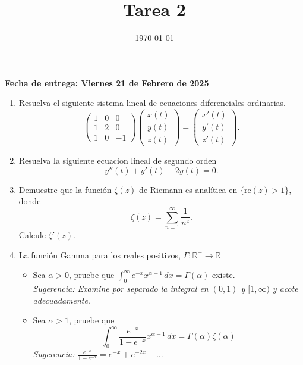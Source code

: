 \documentclass[letterpaper]{article}
\date{\today}
\title{Tarea 2}
\newcommand{\re}{\ensuremath{\mathbb R }}
\begin{document}
\maketitle

\textbf{Fecha de entrega: Viernes 21 de Febrero de 2025}

\begin{enumerate}
\item Resuelva el siguiente sistema lineal de ecuaciones diferenciales ordinarias.
  \[
    \begin{pmatrix} 1 & 0 & 0\\
                    1 & 2 & 0\\
                    1 & 0 & -1
        \end{pmatrix}\begin{pmatrix} x(t)\\y(t)\\z(t)\end{pmatrix}=\begin{pmatrix} x'(t)\\y'(t)\\z'(t)\end{pmatrix}.
  \]
\item Resuelva la siguiente ecuacion lineal de segundo orden
  \[
  y''(t)+y'(t)-2y(t)=0.
  \]
\item Demuestre que la función \(\zeta(z)\) de Riemann es analítica en \(\{\textrm{re}(z)>1\}\), donde
  \[
  \zeta(z)=\sum_{n=1}^{\infty}\frac{1}{n^z}.
  \]
  Calcule \(\zeta'(z)\).
\item La función Gamma para los reales positivos, \(\Gamma:\re^{+}\to\re\)
  \begin{itemize}
    \item Sea \(\alpha>0\), pruebe que \(\int_0^{\infty}e^{-x}x^{\alpha-1}\,dx=\Gamma(\alpha)\) existe.\\
      \emph{Sugerencia: Examine por separado la integral en \((0,1)\) y \([1,\infty)\) y acote adecuadamente}.

    \item Sea \(\alpha>1\), pruebe que
      \[
      \int_0^{\infty}\frac{e^{-x}}{1-e^{-x}}x^{\alpha-1}\,dx=\Gamma(\alpha)\zeta(\alpha)
      \]
      \emph{Sugerencia: \(\frac{e^{-x}}{1-e^{-x}}=e^{-x}+e^{-2x}+\dots\)}
    \end{itemize}
\end{enumerate}
\end{document}
